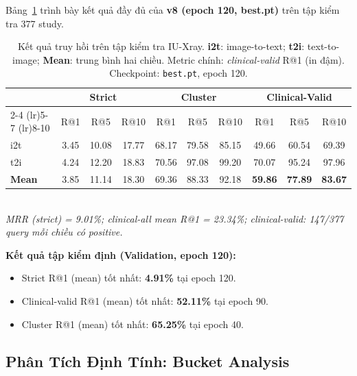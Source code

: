 \documentclass[12pt, a4paper]{article}
\begin{document}
Bảng~\ref{tab:main_results} trình bày kết quả đầy đủ của
\textbf{v8 (epoch 120, best.pt)} trên tập kiểm tra 377 study.

\begin{table}[H]
  \centering
  \caption{Kết quả truy hồi trên tập kiểm tra IU-Xray.
    \textbf{i2t}: image-to-text; \textbf{t2i}: text-to-image; \textbf{Mean}: trung bình hai chiều.
    Metric chính: \textit{clinical-valid} R@1 (in đậm).
    Checkpoint: \texttt{best.pt}, epoch 120.}
  \label{tab:main_results}
  \renewcommand{\arraystretch}{1.15}
  \begin{tabular}{l ccc ccc ccc}
    \toprule
    & \multicolumn{3}{c}{\textbf{Strict}} &
      \multicolumn{3}{c}{\textbf{Cluster}} &
      \multicolumn{3}{c}{\textbf{Clinical-Valid}} \\
    \cmidrule(lr){2-4} \cmidrule(lr){5-7} \cmidrule(lr){8-10}
    & R@1 & R@5 & R@10 & R@1 & R@5 & R@10 & R@1 & R@5 & R@10 \\
    \midrule
    i2t
      & 3.45 & 10.08 & 17.77
      & 68.17 & 79.58 & 85.15
      & 49.66 & 60.54 & 69.39 \\
    t2i
      & 4.24 & 12.20 & 18.83
      & 70.56 & 97.08 & 99.20
      & 70.07 & 95.24 & 97.96 \\
    \midrule
    \textbf{Mean}
      & 3.85 & 11.14 & 18.30
      & 69.36 & 88.33 & 92.18
      & \textbf{59.86} & \textbf{77.89} & \textbf{83.67} \\
    \bottomrule
  \end{tabular}
  \vspace{0.4em}\\
  \small \textit{MRR (strict) = 9.01\%; clinical-all mean R@1 = 23.34\%;
  clinical-valid: 147/377 query mỗi chiều có positive.}
\end{table}

\textbf{Kết quả tập kiểm định (Validation, epoch 120):}
\begin{itemize}
  \item Strict R@1 (mean) tốt nhất: \textbf{4.91\%} tại epoch 120.
  \item Clinical-valid R@1 (mean) tốt nhất: \textbf{52.11\%} tại epoch 90.
  \item Cluster R@1 (mean) tốt nhất: \textbf{65.25\%} tại epoch 40.
\end{itemize}

\subsection{Phân Tích Định Tính: Bucket Analysis}
\end{document}
